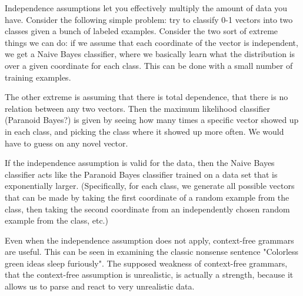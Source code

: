 \documentclass{article}
\newcommand\note[1]{}
\begin{document}
\begin{rem}
  Independence assumptions let you effectively multiply the amount of
  data you have. Consider the following simple problem: try to
  classify 0-1 vectors into two classes given a bunch of labeled
  examples. Consider the two sort of extreme things we can do: if we
  assume that each coordinate of the vector is independent, we get a
  Naive Bayes classifier, where we basically learn what the
  distribution is over a given coordinate for each class. This can be
  done with a small number of training examples.

  The other extreme is assuming that there is total dependence, that
  there is no relation between any two vectors. Then the maximum
  likelihood classifier (Paranoid Bayes?) is given by seeing how many
  times a specific vector showed up in each class, and picking the
  class where it showed up more often. We would have to guess on any
  novel vector.  

  If the independence assumption is valid for the data, then the Naive
  Bayes classifier acts like the Paranoid Bayes classifier trained on
  a data set that is exponentially larger. (Specifically, for each
  class, we generate all possible vectors that can be made by taking
  the first coordinate of a random example from the class, then taking
  the second coordinate from an independently chosen random example
  from the class, etc.)
\end{rem}

Even when the independence assumption does not apply, context-free grammars
are useful. This can be seen in examining the classic nonsense
sentence "Colorless green ideas sleep furiously". The supposed
weakness of context-free grammars, that the context-free assumption is
unrealistic, is actually a strength, because it allows us to parse and
react to very unrealistic data.



\end{document}
